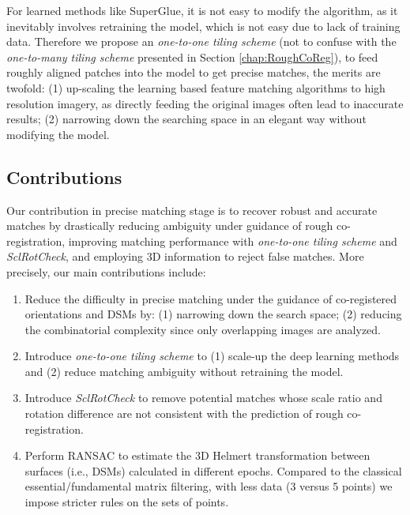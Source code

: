 For learned methods like SuperGlue, it is not easy to modify the algorithm, as it inevitably involves retraining the model, which is not easy due to lack of training data. Therefore we propose an \textit{one-to-one tiling scheme} (not to confuse with the \textit{one-to-many tiling scheme} presented in Section \ref{chap:RoughCoReg}), to feed roughly aligned patches into the model to get precise matches, the merits are twofold: (1) up-scaling the learning based feature matching algorithms to high resolution imagery, as directly feeding the original images often lead to inaccurate results; (2) narrowing down the searching space in an elegant way without modifying the model.
\subsection{Contributions}
Our contribution in precise matching stage is to recover robust and accurate matches by drastically reducing ambiguity under guidance of rough co-registration, improving matching performance with \textit{one-to-one tiling scheme} and \textit{SclRotCheck}, and employing 3D information to reject false matches. More precisely, our main contributions include:\\
\begin{enumerate}
	\item Reduce the difficulty in precise matching under the guidance of co-registered orientations and \ac{DSM}s by: (1) narrowing down the search space; (2) reducing the combinatorial complexity since only overlapping images are analyzed.
	\item Introduce \textit{one-to-one tiling scheme} to (1) scale-up the deep learning methods and (2) reduce matching ambiguity without retraining the model.
	\item Introduce \textit{SclRotCheck} to remove potential matches whose scale ratio and rotation difference are not consistent with the prediction of rough co-registration.
	\item Perform RANSAC to estimate the 3D Helmert transformation between surfaces (i.e., \ac{DSM}s) calculated in different epochs. Compared to the classical essential/fundamental matrix filtering, with less data (3 versus 5 points) we impose stricter rules on the sets of points. 
\end{enumerate}

